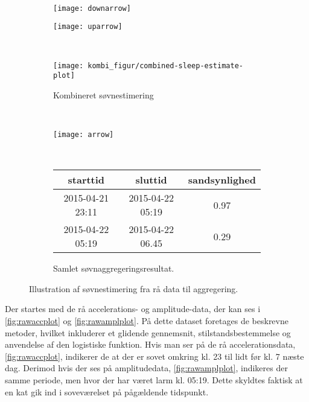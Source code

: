 \begin{figure}
\begin{minipage}{\linewidth}
\begin{subfigure}{0.5\linewidth}
		\end{subfigure}
	\end{minipage}\\[1ex]%
	\begin{minipage}{\linewidth}
		\begin{subfigure}{0.5\linewidth}
			\centering
			\texttt{[image: downarrow]}
		\end{subfigure}
		\begin{subfigure}{0.5\linewidth}
			\centering
			\texttt{[image: uparrow]}
		\end{subfigure}
	\end{minipage}\\[1ex]%
	\begin{minipage}{\linewidth}
		\begin{subfigure}{\linewidth}
			\centering
			\texttt{[image: kombi\_figur/combined-sleep-estimate-plot]}
			\caption{Kombineret søvnestimering}\label{fig:sleepcalcombine}
		\end{subfigure}
	\end{minipage}\\[1ex]%
	\begin{minipage}{\linewidth}
		\begin{subfigure}{\linewidth}
			\centering
			\texttt{[image: arrow]}
		\end{subfigure}
	\end{minipage}\\[1ex]%
	\begin{minipage}{\linewidth}
		\begin{subfigure}{\linewidth}
			\centering
			\begin{tabular}{|c|c|c|}
			\hline starttid & sluttid & sandsynlighed \\ 
			\hline 2015-04-21 23:11 & 2015-04-22 05:19 & 0.97 \\ 
			\hline 2015-04-22 05:19 & 2015-04-22 06.45 & 0.29 \\ 
			\hline 
			\end{tabular}
			\caption{Samlet søvnaggregeringsresultat.}\label{fig:finalagg}
		\end{subfigure}
	\end{minipage}
	\caption{Illustration af søvnestimering fra rå data til aggregering.}\label{fig:totalbanjo}
\end{figure}

Der startes med de rå accelerations- og amplitude-data, der kan ses i \cref{fig:rawaccplot} og \cref{fig:rawamplplot}.
På dette dataset foretages de beskrevne metoder, hvilket inkluderer et glidende gennemsnit, stilstandsbestemmelse og anvendelse af den logistiske funktion.
Hvis man ser på de rå accelerationsdata, \cref{fig:rawaccplot}, indikerer de at der er sovet omkring kl. 23 til lidt før kl. 7 næste dag.
Derimod hvis der ses på amplitudedata, \cref{fig:rawamplplot}, indikeres der samme periode, men hvor der har været larm kl. 05:19.
Dette skyldtes faktisk at en kat gik ind i soveværelset på pågældende tidspunkt.


